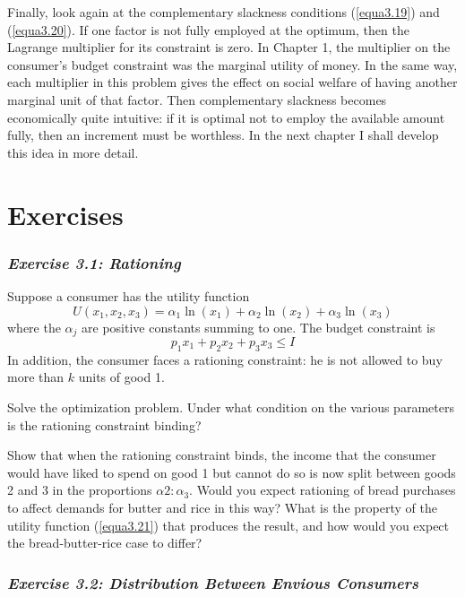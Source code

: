 Finally, look again at the complementary slackness conditions (\ref{equa3.19}) and (\ref{equa3.20}). If one factor is not fully employed at the optimum, then the Lagrange multiplier for its constraint is zero. In Chapter 1, the multiplier on the consumer's budget constraint was the marginal utility of money. In the same way, each multiplier in this problem gives the effect on social welfare of having another marginal unit of that factor. Then complementary slackness becomes economically quite intuitive: if it is optimal not to employ the available amount fully, then an increment must be worthless. In the next chapter I shall develop this idea in more detail.

\section*{Exercises}

\subsubsection*{\textit{Exercise 3.1: Rationing}}

Suppose a consumer has the utility function
\begin{equation} \label{equa3.21}
U(x_1, x_2, x_3) = \alpha_1 \ln (x_1) + \alpha_2 \ln (x_2) +\alpha_3 \ln (x_3)
\end{equation}
where the $\alpha_j$ are positive constants summing to one. The budget constraint is
\begin{equation*}
p_1 x_1 + p_2 x_2 + p_3 x_3 \leq I
\end{equation*}
In addition, the consumer faces a rationing constraint: he is not allowed to buy more than $k$ units of good 1.

Solve the optimization problem. Under what condition on the various parameters is the rationing constraint binding?

Show that when the rationing constraint binds, the income that the consumer would have liked to spend on good 1 but cannot do so is now split between goods 2 and 3 in the proportions $\alpha2 : \alpha_3$. Would you expect rationing of bread purchases to affect demands for butter and rice in this way? What is the property of the utility function (\ref{equa3.21}) that produces the result, and how would you expect the bread-butter-rice case to differ?

\subsubsection*{\textit{Exercise 3.2: Distribution Between Envious Consumers}}

